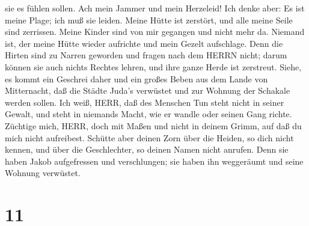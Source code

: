 sie es fühlen sollen.  Ach mein Jammer und mein Herzeleid!
Ich denke aber: Es ist meine Plage; ich muß sie leiden. 
Meine Hütte ist zerstört, und alle meine Seile sind zerrissen. Meine
Kinder sind von mir gegangen und nicht mehr da. Niemand ist, der meine
Hütte wieder aufrichte und mein Gezelt aufschlage.  Denn
die Hirten sind zu Narren geworden und fragen nach dem HERRN nicht;
darum können sie auch nichts Rechtes lehren, und ihre ganze Herde ist
zerstreut.  Siehe, es kommt ein Geschrei daher und ein
großes Beben aus dem Lande von Mitternacht, daß die Städte Juda's
verwüstet und zur Wohnung der Schakale werden sollen.  Ich
weiß, HERR, daß des Menschen Tun steht nicht in seiner Gewalt, und steht
in niemands Macht, wie er wandle oder seinen Gang richte. 
Züchtige mich, HERR, doch mit Maßen und nicht in deinem Grimm, auf daß
du mich nicht aufreibest.  Schütte aber deinen Zorn über
die Heiden, so dich nicht kennen, und über die Geschlechter, so deinen
Namen nicht anrufen. Denn sie haben Jakob aufgefressen und verschlungen;
sie haben ihn weggeräumt und seine Wohnung verwüstet.

\hypertarget{section-10}{%
\section{11}\label{section-10}}


